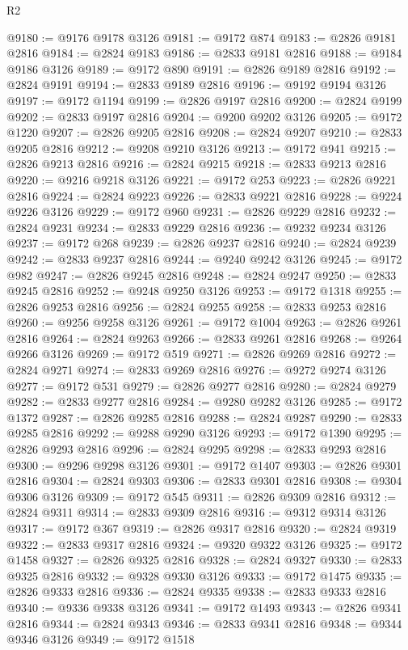 \begin{lexlean}{R2}
\begin{coremodule}
@9180 := @9176 @9178 @3126
@9181 := @9172 @874
@9183 := @2826 @9181 @2816
@9184 := @2824 @9183
@9186 := @2833 @9181 @2816
@9188 := @9184 @9186 @3126
@9189 := @9172 @890
@9191 := @2826 @9189 @2816
@9192 := @2824 @9191
@9194 := @2833 @9189 @2816
@9196 := @9192 @9194 @3126
@9197 := @9172 @1194
@9199 := @2826 @9197 @2816
@9200 := @2824 @9199
@9202 := @2833 @9197 @2816
@9204 := @9200 @9202 @3126
@9205 := @9172 @1220
@9207 := @2826 @9205 @2816
@9208 := @2824 @9207
@9210 := @2833 @9205 @2816
@9212 := @9208 @9210 @3126
@9213 := @9172 @941
@9215 := @2826 @9213 @2816
@9216 := @2824 @9215
@9218 := @2833 @9213 @2816
@9220 := @9216 @9218 @3126
@9221 := @9172 @253
@9223 := @2826 @9221 @2816
@9224 := @2824 @9223
@9226 := @2833 @9221 @2816
@9228 := @9224 @9226 @3126
@9229 := @9172 @960
@9231 := @2826 @9229 @2816
@9232 := @2824 @9231
@9234 := @2833 @9229 @2816
@9236 := @9232 @9234 @3126
@9237 := @9172 @268
@9239 := @2826 @9237 @2816
@9240 := @2824 @9239
@9242 := @2833 @9237 @2816
@9244 := @9240 @9242 @3126
@9245 := @9172 @982
@9247 := @2826 @9245 @2816
@9248 := @2824 @9247
@9250 := @2833 @9245 @2816
@9252 := @9248 @9250 @3126
@9253 := @9172 @1318
@9255 := @2826 @9253 @2816
@9256 := @2824 @9255
@9258 := @2833 @9253 @2816
@9260 := @9256 @9258 @3126
@9261 := @9172 @1004
@9263 := @2826 @9261 @2816
@9264 := @2824 @9263
@9266 := @2833 @9261 @2816
@9268 := @9264 @9266 @3126
@9269 := @9172 @519
@9271 := @2826 @9269 @2816
@9272 := @2824 @9271
@9274 := @2833 @9269 @2816
@9276 := @9272 @9274 @3126
@9277 := @9172 @531
@9279 := @2826 @9277 @2816
@9280 := @2824 @9279
@9282 := @2833 @9277 @2816
@9284 := @9280 @9282 @3126
@9285 := @9172 @1372
@9287 := @2826 @9285 @2816
@9288 := @2824 @9287
@9290 := @2833 @9285 @2816
@9292 := @9288 @9290 @3126
@9293 := @9172 @1390
@9295 := @2826 @9293 @2816
@9296 := @2824 @9295
@9298 := @2833 @9293 @2816
@9300 := @9296 @9298 @3126
@9301 := @9172 @1407
@9303 := @2826 @9301 @2816
@9304 := @2824 @9303
@9306 := @2833 @9301 @2816
@9308 := @9304 @9306 @3126
@9309 := @9172 @545
@9311 := @2826 @9309 @2816
@9312 := @2824 @9311
@9314 := @2833 @9309 @2816
@9316 := @9312 @9314 @3126
@9317 := @9172 @367
@9319 := @2826 @9317 @2816
@9320 := @2824 @9319
@9322 := @2833 @9317 @2816
@9324 := @9320 @9322 @3126
@9325 := @9172 @1458
@9327 := @2826 @9325 @2816
@9328 := @2824 @9327
@9330 := @2833 @9325 @2816
@9332 := @9328 @9330 @3126
@9333 := @9172 @1475
@9335 := @2826 @9333 @2816
@9336 := @2824 @9335
@9338 := @2833 @9333 @2816
@9340 := @9336 @9338 @3126
@9341 := @9172 @1493
@9343 := @2826 @9341 @2816
@9344 := @2824 @9343
@9346 := @2833 @9341 @2816
@9348 := @9344 @9346 @3126
@9349 := @9172 @1518

\end{coremodule}
\end{lexlean}
